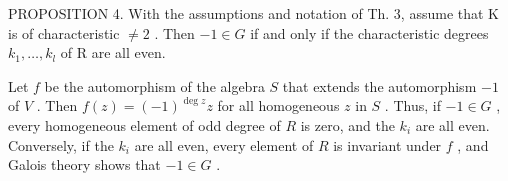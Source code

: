 PROPOSITION 4. With the assumptions and notation of Th. 3, assume that K is of characteristic \(\neq 2\) . Then \(-1 \in G\) if and only if the characteristic degrees \(k_{1}, \ldots, k_{l}\) of R are all even.

Let \(f\) be the automorphism of the algebra \(S\) that extends the automorphism \(-1\) of \(V\) . Then \(f(z) = (-1)^{\deg z}z\) for all homogeneous \(z\) in \(S\) . Thus, if \(-1 \in G\) , every homogeneous element of odd degree of \(R\) is zero, and the \(k_i\) are all even. Conversely, if the \(k_i\) are all even, every element of \(R\) is invariant under \(f\) , and Galois theory shows that \(-1 \in G\) .

